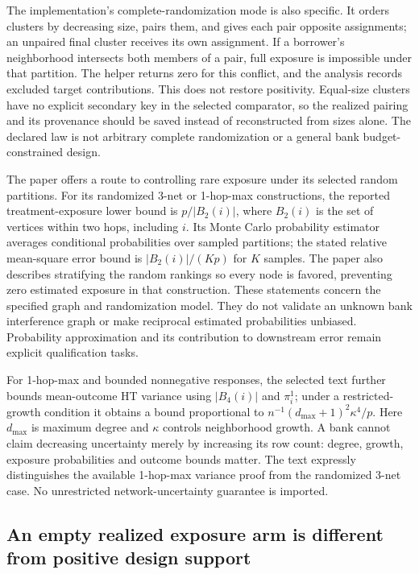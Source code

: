 The implementation's complete-randomization mode is also specific. It orders clusters by decreasing size, pairs them, and gives each pair opposite assignments; an unpaired final cluster receives its own assignment. If a borrower's neighborhood intersects both members of a pair, full exposure is impossible under that partition. The helper returns zero for this conflict, and the analysis records excluded target contributions. This does not restore positivity. Equal-size clusters have no explicit secondary key in the selected comparator, so the realized pairing and its provenance should be saved instead of reconstructed from sizes alone. The declared law is not arbitrary complete randomization or a general bank budget-constrained design.~\citep{exec25_cnet_rgcr,exec25_cnet_choice}

The paper offers a route to controlling rare exposure under its selected random partitions. For its randomized 3-net or 1-hop-max constructions, the reported treatment-exposure lower bound is $p/|B_2(i)|$, where $B_2(i)$ is the set of vertices within two hops, including $i$. Its Monte Carlo probability estimator averages conditional probabilities over sampled partitions; the stated relative mean-square error bound is $|B_2(i)|/(Kp)$ for $K$ samples. The paper also describes stratifying the random rankings so every node is favored, preventing zero estimated exposure in that construction. These statements concern the specified graph and randomization model. They do not validate an unknown bank interference graph or make reciprocal estimated probabilities unbiased. Probability approximation and its contribution to downstream error remain explicit qualification tasks.~\citep{exec25_cnet_paper,exec25_cnet_choice}

For 1-hop-max and bounded nonnegative responses, the selected text further bounds mean-outcome HT variance using $|B_4(i)|$ and $\pi_i^1$; under a restricted-growth condition it obtains a bound proportional to $n^{-1}(d_{\max}+1)^2\kappa^4/p$. Here $d_{\max}$ is maximum degree and $\kappa$ controls neighborhood growth. A bank cannot claim decreasing uncertainty merely by increasing its row count: degree, growth, exposure probabilities and outcome bounds matter. The text expressly distinguishes the available 1-hop-max variance proof from the randomized 3-net case. No unrestricted network-uncertainty guarantee is imported.~\citep{exec25_cnet_paper}

\subsection{An empty realized exposure arm is different from positive design support}

